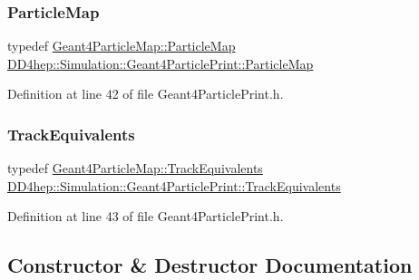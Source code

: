 \subsubsection{\texorpdfstring{Particle\+Map}{ParticleMap}}
{\footnotesize\ttfamily typedef \hyperlink{class_d_d4hep_1_1_simulation_1_1_geant4_particle_map_a065c5fb0629285022b9aa2a628bffef3}{Geant4\+Particle\+Map\+::\+Particle\+Map} \hyperlink{class_d_d4hep_1_1_simulation_1_1_geant4_particle_print_a1c6a9ccb9393484ee16c7cd344e20f4a}{D\+D4hep\+::\+Simulation\+::\+Geant4\+Particle\+Print\+::\+Particle\+Map}}



Definition at line 42 of file Geant4\+Particle\+Print.\+h.

\hypertarget{class_d_d4hep_1_1_simulation_1_1_geant4_particle_print_af3d655fbfb9d0a270a3df703205c4b5b}{}\label{class_d_d4hep_1_1_simulation_1_1_geant4_particle_print_af3d655fbfb9d0a270a3df703205c4b5b} 
\subsubsection{\texorpdfstring{Track\+Equivalents}{TrackEquivalents}}
{\footnotesize\ttfamily typedef \hyperlink{class_d_d4hep_1_1_simulation_1_1_geant4_particle_map_aba09f5fcb2dd5874d129660ad4454a21}{Geant4\+Particle\+Map\+::\+Track\+Equivalents} \hyperlink{class_d_d4hep_1_1_simulation_1_1_geant4_particle_print_af3d655fbfb9d0a270a3df703205c4b5b}{D\+D4hep\+::\+Simulation\+::\+Geant4\+Particle\+Print\+::\+Track\+Equivalents}}



Definition at line 43 of file Geant4\+Particle\+Print.\+h.



\subsection{Constructor \& Destructor Documentation}
\hypertarget{class_d_d4hep_1_1_simulation_1_1_geant4_particle_print_a58c9b621de94baca62700ae958afc596}{}\label{class_d_d4hep_1_1_simulation_1_1_geant4_particle_print_a58c9b621de94baca62700ae958afc596} 
